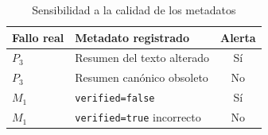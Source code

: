 \begin{table}[!t]
\caption{Sensibilidad a la calidad de los metadatos}
\label{tab:metadata_quality}
\centering\footnotesize
\begin{tabular}{llc}
\hline
Fallo real & Metadato registrado & Alerta\\\hline
$P_3$ & Resumen del texto alterado & Sí\\
$P_3$ & Resumen canónico obsoleto & No\\
$M_1$ & \texttt{verified=false} & Sí\\
$M_1$ & \texttt{verified=true} incorrecto & No\\
\hline
\end{tabular}
\end{table}
